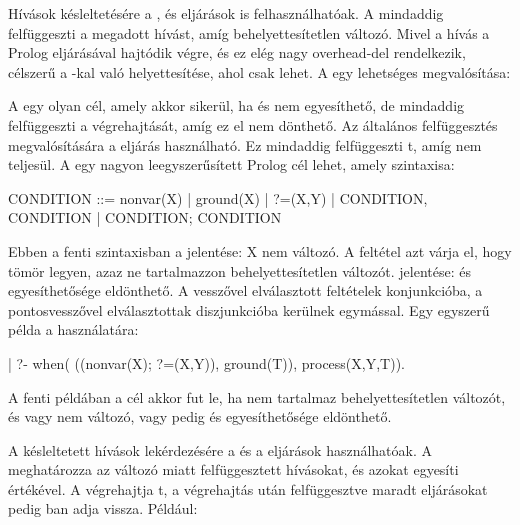 Hívások késleltetésére a ,  és  eljárások
is felhasználhatóak. A  mindaddig felfüggeszti a
megadott hívást, amíg  behelyettesítetlen változó. Mivel a hívás a
Prolog  eljárásával hajtódik végre, és ez elég nagy overhead-del
rendelkezik, célszerű a  -kal való helyettesítése, ahol
csak lehet. A  egy lehetséges megvalósítása:


A 
egy olyan cél, amely akkor sikerül, ha  és  nem egyesíthető, de
mindaddig felfüggeszti a végrehajtását, amíg ez el nem dönthető. Az általános
felfüggesztés megvalósítására a  eljárás használható.
Ez mindaddig felfüggeszti t, amíg  nem teljesül. A
 egy nagyon leegyszerűsített Prolog cél lehet, amely szintaxisa:

\begin{prologcode}
    CONDITION ::=  nonvar(X) | ground(X) | ?=(X,Y) |
                   CONDITION, CONDITION |
                   CONDITION; CONDITION
\end{prologcode}

Ebben a fenti szintaxisban a  jelentése: X nem változó. A
 feltétel azt várja el, hogy  tömör legyen, azaz ne
tartalmazzon behelyettesítetlen változót.  jelentése:
 és  egyesíthetősége eldönthető. A vesszővel elválasztott
feltételek konjunkcióba, a pontosvesszővel elválasztottak diszjunkcióba
kerülnek egymással. Egy egyszerű példa a  használatára:

\begin{prologcode}
| ?- when( ((nonvar(X); ?=(X,Y)), ground(T)), process(X,Y,T)).
\end{prologcode}

A fenti példában a  cél akkor fut le, ha  nem
tartalmaz behelyettesítetlen változót, és vagy  nem változó, vagy
pedig  és  egyesíthetősége eldönthető.

A késleltetett hívások lekérdezésére a  és a 
eljárások használhatóak. A  meghatározza az 
változó miatt felfüggesztett hívásokat, és azokat egyesíti 
értékével. A  végrehajtja t, a
végrehajtás után felfüggesztve maradt eljárásokat pedig ban adja
vissza. Például:

